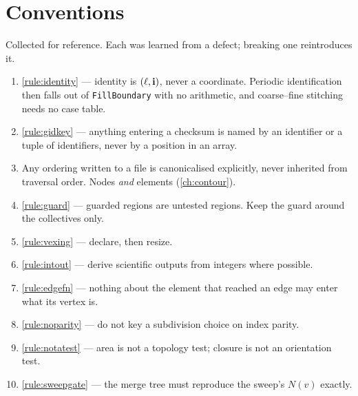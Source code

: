 \chapter{Conventions}
\label{app:conventions}

Collected for reference. Each was learned from a defect; breaking one
reintroduces it.

\begin{enumerate}[leftmargin=*]
\item \cref{rule:identity} --- identity is $(\ell,\mathbf{i})$, never a coordinate.
  Periodic identification then falls out of \texttt{FillBoundary} with no
  arithmetic, and coarse--fine stitching needs no case table.
\item \cref{rule:gidkey} --- anything entering a checksum is named by an
  identifier or a tuple of identifiers, never by a position in an array.
\item Any ordering written to a file is canonicalised explicitly, never
  inherited from traversal order. Nodes \emph{and} elements
  (\cref{ch:contour}).
\item \cref{rule:guard} --- guarded regions are untested regions. Keep the guard
  around the collectives only.
\item \cref{rule:vexing} --- declare, then resize.
\item \cref{rule:intout} --- derive scientific outputs from integers where
  possible.
\item \cref{rule:edgefn} --- nothing about the element that reached an edge may
  enter what its vertex is.
\item \cref{rule:noparity} --- do not key a subdivision choice on index parity.
\item \cref{rule:notatest} --- area is not a topology test; closure is not an
  orientation test.
\item \cref{rule:sweepgate} --- the merge tree must reproduce the sweep's
  $N(v)$ exactly.
\end{enumerate}
